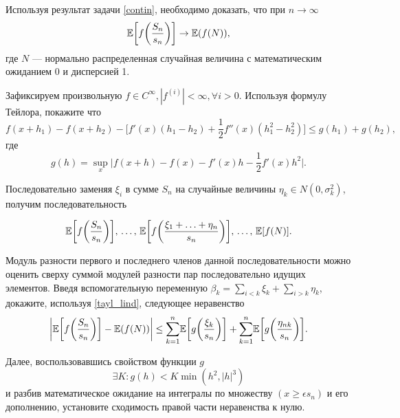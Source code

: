 \begin{ordre}[Л. Биллингсли]
Используя результат задачи \ref{contin}, необходимо доказать, что при $n\to\infty$
\[
\mathrm{{\mathbb E}}\bigg[f\bigg(\frac{S_n}{s_n}\biggr)\biggr] \rightarrow \mathrm{{\mathbb E}}(f(N)),
\] 
где $N$ --- нормально распределенная случайная величина с математическим ожиданием 0 и дисперсией 1.

Зафиксируем произвольную $f \in C^{\infty}, |f^{(i)}| <  \infty, \forall i > 0$.
Используя формулу Тейлора, покажите что
\begin{equation}\label{tayl_lind}
f(x + h_1) - f(x+h_2)  - \bigg[f'(x)(h_1 - h_2) + \frac{1}{2} f''(x)(h_1^2 - h_2^2)\biggr] \leq g(h_1) + g(h_2),
\end{equation}
\noindent где 
$$g(h) = \underset{x}{\sup}\bigg| f(x+h) - f(x) - f'(x)h - \frac{1}{2} f'(x)h^2\biggr|.$$

Последовательно заменяя $\xi_{i}$ в сумме $S_n$ на случайные величины $\eta_{k} \in N(0, \sigma_{k}^2)$, получим последовательность 

\[
\mathrm{{\mathbb E}}\bigg[f\bigg(\frac{S_n}{s_n}\biggr)\biggr],\,
\ldots,\,
\mathrm{{\mathbb E}}\bigg[f\bigg(\frac{\xi_{1} + \ldots + \eta_{n}}{s_n}\biggr)\biggr],\,
\ldots,\,
\mathrm{{\mathbb E}}[f(N)].
\]

Модуль разности первого и последнего членов данной последовательности можно оценить сверху суммой модулей разности пар последовательно идущих элементов.  Введя вспомогательную переменную $\beta_{k} = \underset{i<k}{\sum}\xi_{k} + \underset{i>k}{\sum}\eta_{k}$, докажите, используя \eqref{tayl_lind}, следующее неравенство
\[
\biggr|\mathrm{{\mathbb E}}\bigg[f\bigg(\frac{S_n}{s_n}\biggr)\biggr] - \mathrm{{\mathbb E}}(f(N))\biggr| \leq \underset{k=1}{\overset{n}{\sum}} \mathrm{{\mathbb E}} \bigg[g\bigg(\frac{\xi_{k}}{s_n}\biggr)\biggr] + \underset{k=1}{\overset{n}{\sum}} \mathrm{{\mathbb E}} \bigg[g\bigg(\frac{\eta_{nk}}{s_n}\biggr)\biggr].
\] 

Далее, воспользовавшись свойством функции $g$ 
$$\exists K: g(h) < K \min(h^2, |h|^3)$$
и разбив математическое ожидание на интегралы по множеству  $(x \geq \epsilon s_n)$ и его дополнению, установите сходимость правой части неравенства к нулю.  
\end{ordre}

